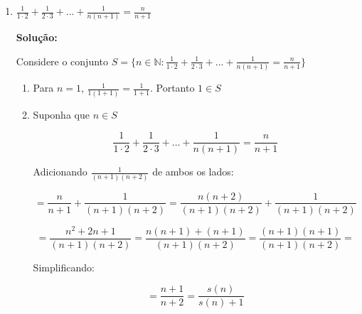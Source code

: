 \documentclass[
  12pt,
  openright,
  a4paper,
  twoside,
  english,
  brazil,
]{article}
\begin{document}
\begin{enumerate}[\bfseries  1.]
\begin{enumerate}[\bfseries (a)]
\begin{enumerate}[$1.$]
          \item Suponha que $n\in S$ tal que
            $1^2+2^2+...+n^2=\frac{n(n+1)(2n+1)}{6}$.

            Podemos somar $(n+1)^2$ em ambos os lados:

            $$
            1^2+2^2+...+n^2+(n+1)^2=\frac{n(n+1)(2n+1)}{6} + (n+1)^2
            $$

            $$
            =(n+1)(\frac{n(2n+1)}{6} + (n+1))=(n+1)(\frac{2n^2+n+6n+6}{6})
            $$

            $$
            =(n+1)(\frac{2n^2+7n+6}{6})=\frac{(n+1)(2n(n+2)+3(n+2))}{6}
            $$

            $$
            =\frac{(n+1)(n+2)(2(n+1)+1)}{6}=\frac{s(n)(s(n)+1)(2s(n)+1)}{6}
            $$

            Portanto $s(n)\in S$. E pelo Princípio da Indução Finita,
            é verdadeiro para todos os números naturais.

        \end{enumerate}

      \item $\frac{1}{1\cdot
        2}+\frac{1}{2\cdot3}+...+\frac{1}{n(n+1)}=\frac{n}{n+1}$

        \textbf{Solução:}

        Considere o conjunto $S=\{n\in\mathbb
        N:\frac{1}{1\cdot2}+\frac{1}{2\cdot3}+...+\frac{1}{n(n+1)}=\frac{n}{n+1}\}$

        \begin{enumerate}[$1.$]
          \item Para $n=1$, $\frac{1}{1(1+1)}=\frac{1}{1+1}$. Portanto $1\in S$

          \item Suponha que $n\in S$

            $$
            \frac{1}{1\cdot2}+\frac{1}{2\cdot3}+...+\frac{1}{n(n+1)}=\frac{n}{n+1}
            $$

            Adicionando $\frac{1}{(n+1)(n+2)}$ de ambos os lados:

            $$
            =\frac{n}{n+1}+\frac{1}{(n+1)(n+2)}=\frac{n(n+2)}{(n+1)(n+2)}+\frac{1}{(n+1)(n+2)}
            $$

            $$
            =\frac{n^2+2n+1}{(n+1)(n+2)}=\frac{n(n+1)+(n+1)}{(n+1)(n+2)}=\frac{(n+1)(n+1)}{(n+1)(n+2)}=
            $$

            Simplificando:

            $$
            =\frac{n+1}{n+2}=\frac{s(n)}{s(n)+1}
            $$


\end{enumerate}
\end{enumerate}
\end{enumerate}
\end{document}
